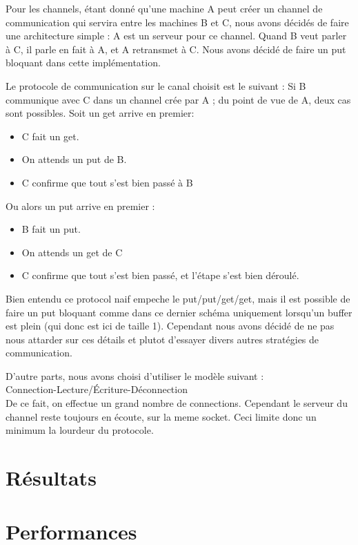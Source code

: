 \documentclass[a4paper]{article}
\begin{document}
Pour les channels, étant donné qu'une machine A peut créer un channel de
communication qui servira entre les machines B et C, nous avons décidés
de faire une architecture simple : A est un serveur pour ce channel.
Quand B veut parler à C, il parle en fait à A, et A retransmet à C.
Nous avons décidé de faire un put bloquant dans cette implémentation.


Le protocole de communication sur le canal choisit est le suivant : 
Si B communique avec C dans un channel crée par A ; du point de vue de A, deux cas sont
possibles. Soit un get arrive en premier: 
\begin{itemize}
\item C fait un get.
\item On attends un put de B.
\item C confirme que tout s'est bien passé à B 
\end{itemize}

Ou alors un put arrive en premier :

\begin{itemize}
\item B fait un put.
\item On attends un get de C
\item C confirme que tout s'est bien passé, et l'étape s'est bien
déroulé.
\end{itemize}

Bien entendu ce protocol naif empeche le put/put/get/get, mais il est
possible de faire un put bloquant comme dans ce dernier schéma
uniquement lorsqu'un buffer est plein (qui donc est ici de taille 1). Cependant nous avons décidé de ne
pas nous attarder sur ces détails et plutot d'essayer divers autres
stratégies de communication.

D'autre parts, nous avons choisi d'utiliser le modèle suivant :\\
Connection-Lecture/Écriture-Déconnection \\
De ce fait, on effectue un grand nombre de connections. Cependant le
serveur du channel reste toujours en écoute, sur la meme socket. Ceci
limite donc un minimum la lourdeur du protocole.


 

\section{Résultats}

\section{Performances}
\end{document}
